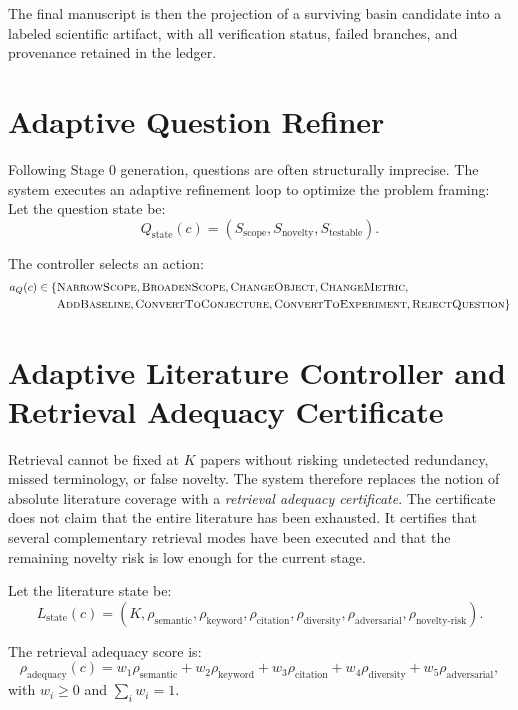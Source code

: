 \documentclass[11pt]{article}
\begin{document}
The final manuscript is then the projection of a surviving basin candidate into a labeled scientific artifact, with all verification status, failed branches, and provenance retained in the ledger.

\section{Adaptive Question Refiner}

Following Stage 0 generation, questions are often structurally imprecise. The system executes an adaptive refinement loop to optimize the problem framing:
Let the question state be:
$$
Q_{\text{state}}(c) = (S_{\text{scope}}, S_{\text{novelty}}, S_{\text{testable}}).
$$

The controller selects an action:
$$
\begin{aligned}
a_Q(c) \in \{ & \textsc{NarrowScope}, \textsc{BroadenScope}, \textsc{ChangeObject}, \textsc{ChangeMetric}, \\
& \textsc{AddBaseline}, \textsc{ConvertToConjecture}, \textsc{ConvertToExperiment}, \textsc{RejectQuestion} \}
\end{aligned}
$$

\section{Adaptive Literature Controller and Retrieval Adequacy Certificate}

Retrieval cannot be fixed at $K$ papers without risking undetected redundancy, missed terminology, or false novelty. The system therefore replaces the notion of absolute literature coverage with a \emph{retrieval adequacy certificate}. The certificate does not claim that the entire literature has been exhausted. It certifies that several complementary retrieval modes have been executed and that the remaining novelty risk is low enough for the current stage.

Let the literature state be:
$$
L_{\text{state}}(c) = (K, \rho_{\text{semantic}}, \rho_{\text{keyword}}, \rho_{\text{citation}}, \rho_{\text{diversity}}, \rho_{\text{adversarial}}, \rho_{\text{novelty-risk}}).
$$

The retrieval adequacy score is:
$$
\rho_{\text{adequacy}}(c)
=
w_1\rho_{\text{semantic}}
+w_2\rho_{\text{keyword}}
+w_3\rho_{\text{citation}}
+w_4\rho_{\text{diversity}}
+w_5\rho_{\text{adversarial}},
$$
with $w_i\geq0$ and $\sum_i w_i=1$.
\end{document}
